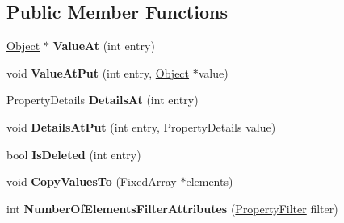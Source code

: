 \subsection*{Public Member Functions}
\begin{DoxyCompactItemize}
\item 
\hyperlink{classv8_1_1internal_1_1_object}{Object} $\ast$ {\bfseries Value\+At} (int entry)\hypertarget{classv8_1_1internal_1_1_dictionary_a51c4bded7e6db0ddf3a4e97edf2127d5}{}\label{classv8_1_1internal_1_1_dictionary_a51c4bded7e6db0ddf3a4e97edf2127d5}

\item 
void {\bfseries Value\+At\+Put} (int entry, \hyperlink{classv8_1_1internal_1_1_object}{Object} $\ast$value)\hypertarget{classv8_1_1internal_1_1_dictionary_abbcb17081750bfa03a130632306d6f51}{}\label{classv8_1_1internal_1_1_dictionary_abbcb17081750bfa03a130632306d6f51}

\item 
Property\+Details {\bfseries Details\+At} (int entry)\hypertarget{classv8_1_1internal_1_1_dictionary_ab21eae90f16085474df143d165453d15}{}\label{classv8_1_1internal_1_1_dictionary_ab21eae90f16085474df143d165453d15}

\item 
void {\bfseries Details\+At\+Put} (int entry, Property\+Details value)\hypertarget{classv8_1_1internal_1_1_dictionary_ac7ca3816f19a4ce1daeb3f5de1f3855b}{}\label{classv8_1_1internal_1_1_dictionary_ac7ca3816f19a4ce1daeb3f5de1f3855b}

\item 
bool {\bfseries Is\+Deleted} (int entry)\hypertarget{classv8_1_1internal_1_1_dictionary_a8e96ee95d576a6d97d7a204ae3b75b89}{}\label{classv8_1_1internal_1_1_dictionary_a8e96ee95d576a6d97d7a204ae3b75b89}

\item 
void {\bfseries Copy\+Values\+To} (\hyperlink{classv8_1_1internal_1_1_fixed_array}{Fixed\+Array} $\ast$elements)\hypertarget{classv8_1_1internal_1_1_dictionary_aeb39c4273e0be7d10b8cfa017bd4c6f5}{}\label{classv8_1_1internal_1_1_dictionary_aeb39c4273e0be7d10b8cfa017bd4c6f5}

\item 
int {\bfseries Number\+Of\+Elements\+Filter\+Attributes} (\hyperlink{namespacev8_afbf02b6b1152a3e25d7bde90798209ac}{Property\+Filter} filter)\hypertarget{classv8_1_1internal_1_1_dictionary_aa85eb29ea0aec478bc408c0c6b5d6284}{}\label{classv8_1_1internal_1_1_dictionary_aa85eb29ea0aec478bc408c0c6b5d6284}


\end{DoxyCompactItemize}
